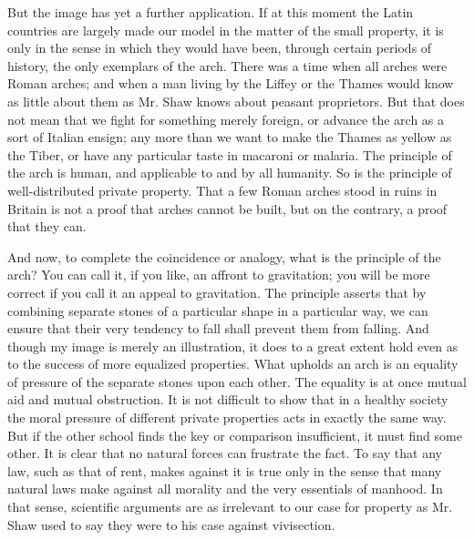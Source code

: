 \documentclass{book}
\begin{document}
But the image has yet a further application. If at this moment the Latin countries are largely made our model in the matter of the small property, it is only in the sense in which they would have been, through certain periods of history, the only exemplars of the arch. There was a time when all arches were Roman arches; and when a man living by the Liffey or the Thames would know as little about them as Mr. Shaw knows about peasant proprietors. But that does not mean that we fight for something merely foreign, or advance the arch as a sort of Italian ensign; any more than we want to make the Thames as yellow as the Tiber, or have any particular taste in macaroni or malaria. The principle of the arch is human, and applicable to and by all humanity. So is the principle of well-distributed private property. That a few Roman arches stood in ruins in Britain is not a proof that arches cannot be built, but on the contrary, a proof that they can.

And now, to complete the coincidence or analogy, what is the principle of the arch? You can call it, if you like, an affront to gravitation; you will be more correct if you call it an appeal to gravitation. The principle asserts that by combining separate stones of a particular shape in a particular way, we can ensure that their very tendency to fall shall prevent them from falling. And though my image is merely an illustration, it does to a great extent hold even as to the success of more equalized properties. What upholds an arch is an equality of pressure of the separate stones upon each other. The equality is at once mutual aid and mutual obstruction. It is not difficult to show that in a healthy society the moral pressure of different private properties acts in exactly the same way. But if the other school finds the key or comparison insufficient, it must find some other. It is clear that no natural forces can frustrate the fact. To say that any law, such as that of rent, makes against it is true only in the sense that many natural laws make against all morality and the very essentials of manhood. In that sense, scientific arguments are as irrelevant to our case for property as Mr. Shaw used to say they were to his case against vivisection.
\end{document}
